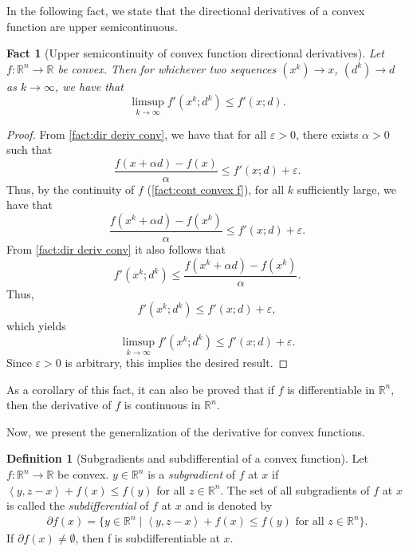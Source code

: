 \documentclass[smallextended,numbook,nospthms]{svjour3}
\theoremstyle{plain}
\newtheorem{fact}[theorem]{Fact}
\theoremstyle{definition}
\newtheorem{definition}[theorem]{Definition}
\def\RR{\mathds R}
\newcommand{\scal}[2]{\left\langle{#1},{#2}  \right\rangle}
\begin{document}
In the following fact, we state that the directional derivatives of a convex function are upper semicontinuous.
\begin{fact}[Upper semicontinuity of convex function directional derivatives]\label{fact:dir deriv upper semicont}
Let $f: \RR^n \rightarrow \RR$ be convex. Then for whichever two sequences $(x^k) \rightarrow x$,	$(d^k) \rightarrow d$ as $k \rightarrow \infty$, we have that
\[
\limsup_{k \rightarrow \infty} f'(x^k;d^k) \leq f'(x;d).
\]
\end{fact}
\begin{proof}
	From \cref{fact:dir deriv conv}, we have that for all $\varepsilon>0$, there exists $\alpha>0$ such that
	\[
	\frac{f(x+\alpha d)-f(x)}{\alpha} \leq f'(x;d) + \varepsilon.
	\]
	Thus, by the continuity of $f$ (\cref{fact:cont convex f}), for all $k$ sufficiently large, we have that
	\[
	\frac{f(x^k+\alpha d)-f(x^k)}{\alpha} \leq f'(x;d) + \varepsilon.
	\]
	From \cref{fact:dir deriv conv} it also follows that
	\[
	f'(x^k;d^k)\leq\frac{f(x^k+\alpha d)-f(x^k)}{\alpha}.
	\]
	Thus,
	\[
	f'(x^k;d^k) \leq f'(x;d) + \varepsilon,
	\]
	which yields
	\[
	\limsup_{k \rightarrow \infty} f'(x^k;d^k) \leq f'(x;d) + \varepsilon.
	\]
	Since $\varepsilon>0$ is arbitrary, this implies the desired result.
\end{proof}
As a corollary of this fact, it can also be proved that if $f$ is differentiable in $\RR^n$, then the derivative of $f$ is continuous in $\RR^n$.

Now, we present the generalization of the derivative for convex functions.
\begin{definition}[Subgradients and subdifferential of a convex function]\label{def:subdif}
Let $f: \RR^n \rightarrow \RR$ be convex. $y \in \RR^n$ is a \emph{subgradient} of $f$ at $x$ if $\scal{y}{z-x} + f(x) \leq f(y)$ for all $z \in \RR^n$. The set of all subgradients of $f$ at $x$ is called the \emph{subdifferential} of $f$ at $x$ and is denoted by 
\begin{align}
	\partial f(x) = \{y \in \RR^n \mid \scal{y}{z-x} + f(x) \leq f(y) \text{ for all } z \in \RR^n \}.	
\end{align}
If $\partial f(x) \not = \emptyset$, then f is subdifferentiable at $x$.
\end{definition}
\end{document}

